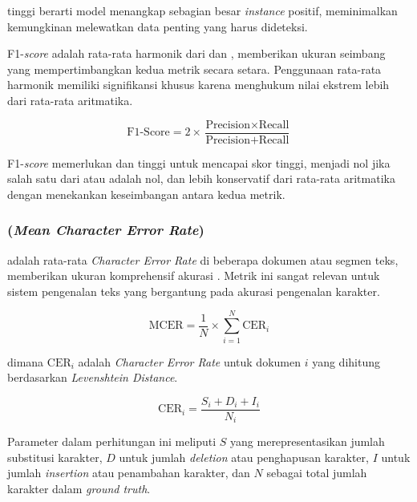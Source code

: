 \recall tinggi berarti model menangkap sebagian besar \emph{instance} positif, meminimalkan kemungkinan melewatkan data penting yang harus dideteksi.

F1-\emph{score} adalah rata-rata harmonik dari \precision dan \recall, memberikan ukuran seimbang yang mempertimbangkan kedua metrik secara setara. Penggunaan rata-rata harmonik memiliki signifikansi khusus karena menghukum nilai ekstrem lebih dari rata-rata aritmatika.

\begin{equation}
\text{F1-Score} = 2 \times \frac{\text{Precision} \times \text{Recall}}{\text{Precision} + \text{Recall}}
\end{equation}

F1-\emph{score} memerlukan \precision dan \recall tinggi untuk mencapai skor tinggi, menjadi nol jika salah satu dari \precision atau \recall adalah nol, dan lebih konservatif dari rata-rata aritmatika dengan menekankan keseimbangan antara kedua metrik.

% 

\subsubsection{\mcer (\emph{Mean Character Error Rate})}

\mcer adalah rata-rata \emph{Character Error Rate} di beberapa dokumen atau segmen teks, memberikan ukuran komprehensif akurasi \ocr \parencite{holley2009ocr}. Metrik ini sangat relevan untuk sistem pengenalan teks yang bergantung pada akurasi pengenalan karakter.

\begin{equation}
\text{MCER} = \frac{1}{N} \times \sum_{i=1}^{N} \text{CER}_i
\end{equation}

dimana $\text{CER}_i$ adalah \emph{Character Error Rate} untuk dokumen $i$ yang dihitung berdasarkan \emph{Levenshtein Distance}.

\begin{equation}
\text{CER}_i = \frac{S_i + D_i + I_i}{N_i}
\end{equation}

Parameter dalam perhitungan ini meliputi $S$ yang merepresentasikan jumlah substitusi karakter, $D$ untuk jumlah \emph{deletion} atau penghapusan karakter, $I$ untuk jumlah \emph{insertion} atau penambahan karakter, dan $N$ sebagai total jumlah karakter dalam \emph{ground truth}.

